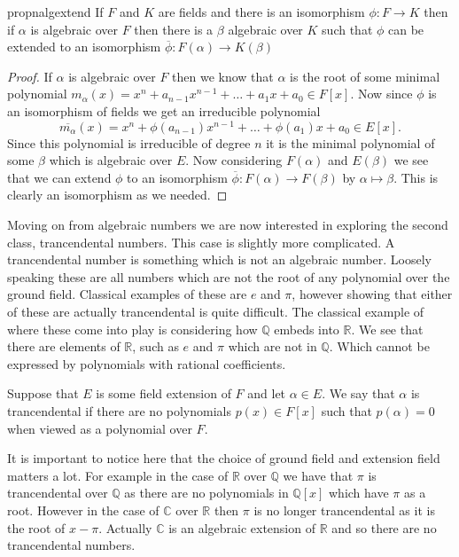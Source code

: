 \begin{restatable}{propn}{algextend}
\label{propn:algextend}
  If $F$ and $K$ are fields and there is an isomorphism $\phi: F \to K$ then if
  $\alpha$ is algebraic over $F$ then there is a $\beta$ algebraic over $K$ 
  such that $\phi$ can be extended to an isomorphism $\overline{\phi}:
  F(\alpha) \to K(\beta)$
\end{restatable}
\begin{proof}
  If $\alpha$ is algebraic over $F$ then we know that $\alpha$ is the root of
  some minimal polynomial $m_{\alpha}(x) = x^{n} + a_{n-1}x^{n-1} + \ldots
  + a_1x + a_0 \in F[x]$. Now since $\phi$ is an isomorphism of fields we get
  an irreducible polynomial 
  \[
    \overline{m_{\alpha}}(x) = x^{n} + \phi(a_{n-1})x^{n-1} + \ldots
    + \phi(a_1)x + a_0 \in E[x]
  .\] 
  Since this polynomial is irreducible of degree $n$ it is the minimal
  polynomial of some $\beta$ which is algebraic over $E$. Now considering
  $F(\alpha)$ and $E(\beta)$ we see that we can extend $\phi$ to an isomorphism
   $\overline{\phi}: F(\alpha) \to F(\beta)$ by $\alpha \mapsto \beta$. This is
   clearly an isomorphism as we needed.
\end{proof}

Moving on from algebraic numbers we are now interested in exploring the second
class, trancendental numbers. This case is slightly more complicated.
A trancendental number is something which is not an algebraic number. Loosely
speaking these are all numbers which are not the root of any polynomial over
the ground field. Classical examples of these are $e$ and $\pi$, however
showing that either of these are actually trancendental is quite difficult. The
classical example of where these come into play is considering how $\mathbb{Q}$
embeds into $\mathbb{R}$. We see that there are elements of $\mathbb{R}$, such
as $e$ and $\pi$ which are not in $\mathbb{Q}$. Which cannot be expressed by
polynomials with rational coefficients. 


\begin{defn}
  Suppose that $E$ is some field extension of $F$ and let $\alpha \in E$. We
  say that $\alpha$ is trancendental if there are no polynomials  $p(x) \in
  F[x]$ such that $p(\alpha) = 0$ when viewed as a polynomial over $F$.
\end{defn}

\begin{remark}
  It is important to notice here that the choice of ground field and extension
  field matters a lot. For example in the case of $\mathbb{R}$ over
  $\mathbb{Q}$ we have that $\pi$ is trancendental over $\mathbb{Q}$ as there
  are no polynomials in $\mathbb{Q}[x]$ which have $\pi$ as a root. However
  in the case of $\mathbb{C}$ over $\mathbb{R}$ then $\pi$ is no longer
  trancendental as it is the root of $x - \pi$. Actually $\mathbb{C}$ is an
  algebraic extension of $\mathbb{R}$ and so there are no trancendental
  numbers.
\end{remark}

